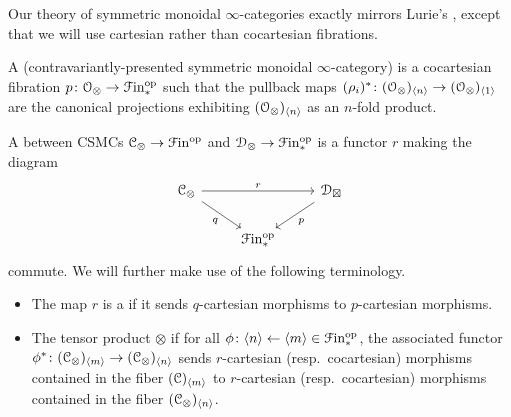 \documentclass[main.tex]{subfiles}
\begin{document}
Our theory of symmetric monoidal $\infty$-categories exactly mirrors Lurie's \cite{luriehigheralgebra}, except that we will use cartesian rather than cocartesian fibrations.

\begin{definition}
  A  (contravariantly-presented symmetric monoidal $\infty$-category) is a cocartesian fibration $p\colon \mathcal{O}_{\otimes} \to \mathcal{F}\mathrm{in}_{*}^{\mathrm{op}}$ such that the pullback maps $(\rho_{i})^{*}\colon (\mathcal{O}_{ \otimes})_{\langle n \rangle} \to (\mathcal{O}_{ \otimes})_{\langle 1 \rangle}$ are the canonical projections exhibiting $(\mathcal{O}_{ \otimes})_{\langle n \rangle}$ as an $n$-fold product.
\end{definition}

\begin{definition}
  A  between CSMCs $\mathcal{C}_{\otimes} \to \mathcal{F}\mathrm{in}^{\mathrm{op}}$ and $\mathcal{D}_{\otimes} \to \mathcal{F}\mathrm{in}_{*}^{\mathrm{op}}$ is a functor $r$ making the diagram
  \begin{equation*}
    \begin{tikzcd}
      \category{C}_{\otimes}
      \arrow[rr, "r"]
      \arrow[dr, swap, "q"]
      && \category{D}_{\boxtimes}
      \arrow[dl, "p"]
      \\
      & \Finp\op
    \end{tikzcd}
  \end{equation*}
  commute. We will further make use of the following terminology.
  \begin{itemize}
    \item The map $r$ is a  if it sends $q$-cartesian morphisms to $p$-cartesian morphisms.

    \item The tensor product $\otimes$  if for all $\phi\colon \langle n \rangle \leftarrow \langle m \rangle \in \mathcal{F}\mathrm{in}_{*}^{\mathrm{op}}$, the associated functor $\phi^{*}\colon (\mathcal{C}_{\otimes})_{\langle m \rangle} \to (\mathcal{C}_{\otimes})_{\langle n \rangle}$ sends $r$-cartesian (resp.\ cocartesian) morphisms contained in the fiber $(\mathcal{C})_{\langle m \rangle}$ to $r$-cartesian (resp.\ cocartesian) morphisms contained in the fiber $(\mathcal{C}_{\otimes})_{\langle n \rangle}$.
  \end{itemize}
\end{definition}
\end{document}
